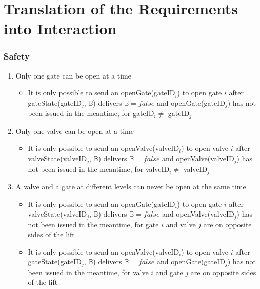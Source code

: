 \section{Translation of the Requirements into Interaction}
\subsubsection*{Safety}
\begin{enumerate}
	\item Only one gate can be open at a time
		\begin{itemize}
			\item It is only possible to send an openGate(gateID$_i$) to open gate $i$ after gateState(gateID$_j$, $ \mathbb{B} $) delivers $\mathbb{B} = false$ and openGate(gateID$_j$) has not been issued in the meantime, for gateID$_i \neq$ gateID$_j$
		\end{itemize}
	
	\item Only one valve can be open at a time
		\begin{itemize}
			\item It is only possible to send an openValve(valveID$_i$) to open valve $i$ after valveState(valveID$_j$, $ \mathbb{B} $) delivers $\mathbb{B} = false$ and openValve(valveID$_j$) has not been issued in the meantime, for valveID$_i \neq$ valveID$_j$
		\end{itemize}
	
	\item A valve and a gate at different levels can never be open at the same time
		\begin{itemize}
			\item It is only possible to send an openGate(gateID$_i$) to open gate $i$ after valveState(valveID$_j$, $ \mathbb{B} $) delivers $\mathbb{B} = false$ and openValve(valveID$_j$) has not been issued in the meantime, for gate $i$ and valve $j$ are on opposite sides of the lift 
			\item It is only possible to send an openValve(valveID$_i$) to open valve $i$ after gateState(gateID$_j$, $ \mathbb{B} $) delivers $\mathbb{B} = false$ and openGate(gateID$_j$) has not been issued in the meantime, for valve $i$ and gate $j$ are on opposite sides of the lift
		\end{itemize}
	
	

\end{enumerate}
